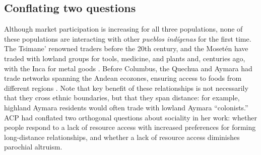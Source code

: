 \documentclass[bibauthoryear]{aa}
\begin{document}
\subsection{Conflating two questions}\label{twoquest}
Although market participation is increasing for all three populations, none of these populations are interacting with other \textit{pueblos ind\'igenas} for the first time. The Tsimane' renowned traders before the 20th century, and the Moset\'en have traded with lowland groups for tools, medicine, and plants \citep{lathrap1973antiquity, ringhofer2010exploring} and, centuries ago, with the Inca for metal goods \citep{godoy2015natural}. Before  Columbus, the Quechua and Aymara had trade networks spanning the Andean ecozones, ensuring access to foods from different regions \citep{klein2011concise}. Note that key benefit of these relationships is not necessarily that they cross ethnic boundaries, but that they span distance: for example, highland Aymara residents would often trade with lowland Aymara ``colonists.'' ACP had conflated two orthogonal questions about sociality in her work: whether people respond to a lack of resource access with increased preferences for forming long-distance   relationships, and whether a lack of resource access diminishes parochial altruism.
\end{document}
